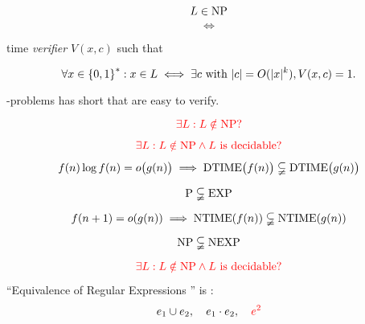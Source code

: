 
\begin{frame}
  \begin{definition}[\np]
	\[
	  L \in \text{NP}
	\]
	\[
	  \iff
	\]
	\begin{center}
	  \red{$\exists$}  time \emph{verifier} $V(x,c)$ such that
	\end{center}
	\[
	  \forall x \in \left\{ 0,1 \right\}^{\ast}: x \in L \iff \exists c \text{ with } |c| = O(|x|^{k}), V(x,c) = 1.
	\]
  \end{definition}

  \vspace{0.50cm}
  \begin{center}
	{\large \np-problems has short  that are easy to verify.}
  \end{center}
\end{frame}

\begin{frame}
  \[
	\textcolor{red}{\exists L: L \notin \text{NP}?}
  \]

  \pause
\end{frame}

\begin{frame}
  \[
	\textcolor{red}{\exists L: L \notin \text{NP} \land L \text{ is decidable}?}
  \]

  \begin{theorem}
	\[
	  f(n) \log f(n) = o\big(g(n)\big) \implies \text{DTIME}\big(f(n)\big) \subsetneqq \text{DTIME}\big(g(n)\big)
	\]
  \end{theorem}

  \pause
  \[
	\text{P} \subsetneqq \text{EXP}
  \]

  \begin{theorem}
	\[
	  f(n + 1) = o(g(n)) \implies \text{NTIME}(f(n)) \subsetneqq \text{NTIME}(g(n))
	\]
  \end{theorem}

  \pause
  \[
	\text{NP} \subsetneqq \text{NEXP}
  \]
\end{frame}

\begin{frame}
  \[
	\textcolor{red}{\exists L: L \notin \text{NP} \land L \text{ is decidable}?}
  \]

  \pause
  \vspace{0.50cm}
  \begin{exampleblock}{``Equivalence of Regular Expressions '' is \nexpc:}
	\[
	  e_1 \cup e_2,\quad e_1 \cdot e_2,\quad \textcolor{red}{e^{2}}
	\]
  \end{exampleblock}
\end{frame}
